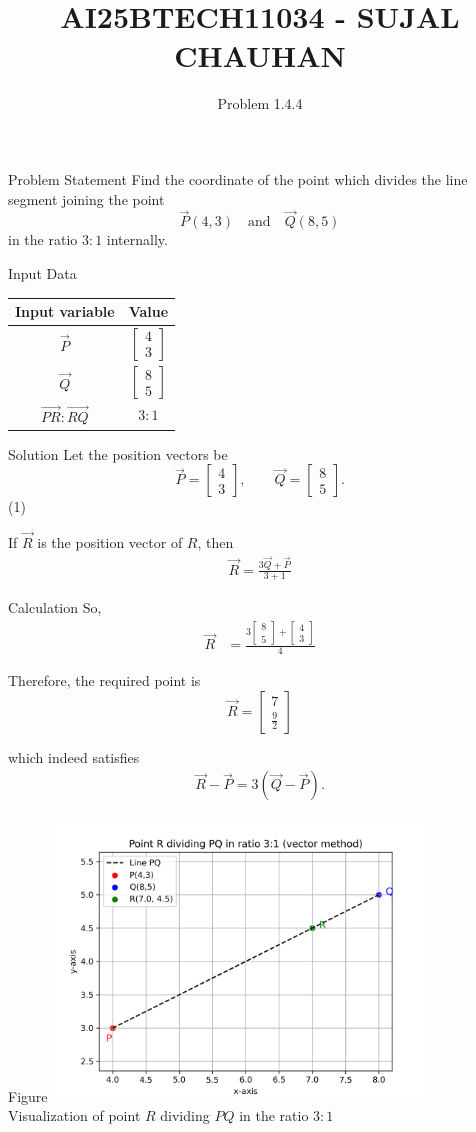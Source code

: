\documentclass{beamer}
\title{AI25BTECH11034 - SUJAL CHAUHAN}
\subtitle{Problem 1.4.4}
\author{}
\date{}
\newcommand{\myvec}[1]{\begin{bmatrix}#1\end{bmatrix}}
\begin{document}
\frame{\titlepage}

\begin{frame}{Problem Statement}
Find the coordinate of the point which divides the line segment joining the point 
\[
\vec{P}(4,3) \quad \text{and} \quad \vec{Q}(8,5)
\]
in the ratio \(3:1\) internally.
\end{frame}

\begin{frame}{Input Data}
\centering
\begin{tabular}{|c|c|}
    \hline
    \textbf{Input variable} & \textbf{Value} \\ 
    \hline
    $\vec{P}$ & $\myvec{4 \\ 3}$ \\
    \hline 
    $\vec{Q}$ & $\myvec{8 \\ 5}$ \\
    \hline
    $\vec{PR}:\vec{RQ}$ & $3:1$ \\
    \hline
\end{tabular}
\end{frame}

\begin{frame}{Solution}
Let the position vectors be
\[
\vec{P} = \myvec{4 \\ 3}, \qquad
\vec{Q} = \myvec{8 \\ 5}.
\] 
\hfill{(1)}

If $\vec{R}$ is the position vector of $R$, then
\begin{align}
\vec{R} = \frac{3\vec{Q} + \vec{P}}{3+1} \tag{2}
\end{align}
\end{frame}

\begin{frame}{Calculation}
So,
\begin{align}
\vec{R} &= \frac{3\myvec{8 \\ 5} + \myvec{4 \\ 3}}{4} \tag{3}
\end{align}

Therefore, the required point is
\[
\boxed{\vec{R} = \myvec{7 \\ \tfrac{9}{2}}} \tag{4}
\]

which indeed satisfies
\begin{align}
\vec{R} - \vec{P} = 3(\vec{Q} - \vec{P}). \tag{5}
\end{align}
\end{frame}

\begin{frame}{Figure}
\centering
\includegraphics[width=0.75\textwidth]{figures/plot.png}
\\
{\small Visualization of point $R$ dividing $PQ$ in the ratio $3:1$}
\end{frame}
\end{document}
